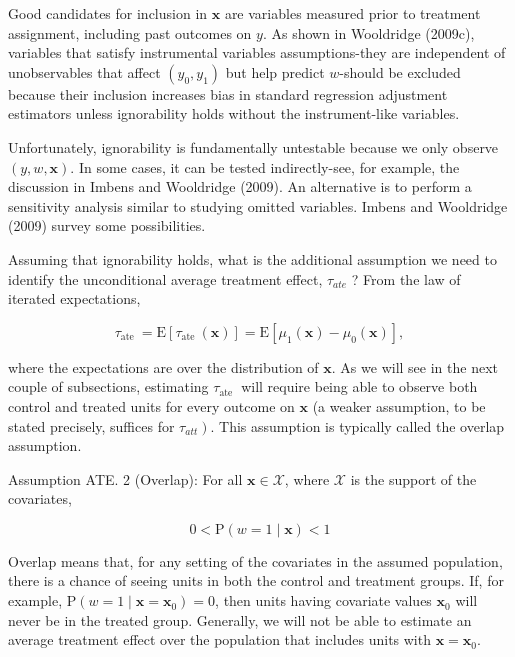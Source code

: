 \documentclass[10pt]{article}
\begin{document}
Good candidates for inclusion in $\mathbf{x}$ are variables measured prior to treatment assignment, including past outcomes on $y$. As shown in Wooldridge (2009c), variables that satisfy instrumental variables assumptions-they are independent of unobservables that affect $\left(y_{0}, y_{1}\right)$ but help predict $w$-should be excluded because their inclusion increases bias in standard regression adjustment estimators unless ignorability holds without the instrument-like variables.

Unfortunately, ignorability is fundamentally untestable because we only observe $(y, w, \mathbf{x})$. In some cases, it can be tested indirectly-see, for example, the discussion in Imbens and Wooldridge (2009). An alternative is to perform a sensitivity analysis similar to studying omitted variables. Imbens and Wooldridge (2009) survey some possibilities.

Assuming that ignorability holds, what is the additional assumption we need to identify the unconditional average treatment effect, $\tau_{a t e}$ ? From the law of iterated expectations,


\begin{equation*}
\tau_{\text {ate }}=\mathrm{E}\left[\tau_{\text {ate }}(\mathbf{x})\right]=\mathrm{E}\left[\mu_{1}(\mathbf{x})-\mu_{0}(\mathbf{x})\right], \tag{21.10}
\end{equation*}


where the expectations are over the distribution of $\mathbf{x}$. As we will see in the next couple of subsections, estimating $\tau_{\text {ate }}$ will require being able to observe both control and treated units for every outcome on $\mathbf{x}$ (a weaker assumption, to be stated precisely, suffices for $\left.\tau_{a t t}\right)$. This assumption is typically called the overlap assumption.

Assumption ATE. 2 (Overlap): For all $\mathbf{x} \in \mathscr{X}$, where $\mathscr{X}$ is the support of the covariates,


\begin{equation*}
0<\mathrm{P}(w=1 \mid \mathbf{x})<1 \tag{21.11}
\end{equation*}


Overlap means that, for any setting of the covariates in the assumed population, there is a chance of seeing units in both the control and treatment groups. If, for\\
example, $\mathrm{P}\left(w=1 \mid \mathbf{x}=\mathbf{x}_{0}\right)=0$, then units having covariate values $\mathbf{x}_{0}$ will never be in the treated group. Generally, we will not be able to estimate an average treatment effect over the population that includes units with $\mathbf{x}=\mathbf{x}_{0}$.
\end{document}
